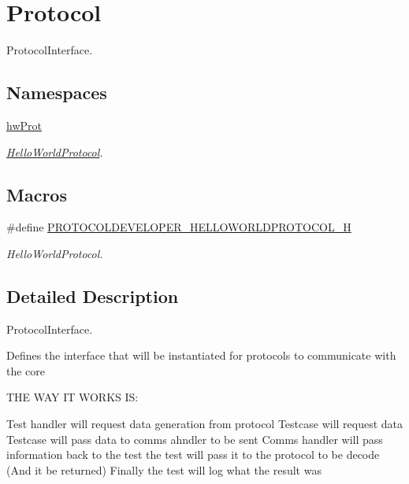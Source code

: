 \hypertarget{group__Protocol}{}\section{Protocol}
\label{group__Protocol}


Protocol\+Interface.  


\subsection*{Namespaces}
\begin{DoxyCompactItemize}
\item 
 \mbox{\hyperlink{namespacehwProt}{hw\+Prot}}
\begin{DoxyCompactList}\small\item\em \mbox{\hyperlink{classhwProt_1_1HelloWorldProtocol}{Hello\+World\+Protocol}}. \end{DoxyCompactList}\end{DoxyCompactItemize}
\subsection*{Macros}
\begin{DoxyCompactItemize}
\item 
\#define \mbox{\hyperlink{group__Protocol_ga2ed8336db1a0003c9333b1a4a38e21f2}{P\+R\+O\+T\+O\+C\+O\+L\+D\+E\+V\+E\+L\+O\+P\+E\+R\+\_\+\+H\+E\+L\+L\+O\+W\+O\+R\+L\+D\+P\+R\+O\+T\+O\+C\+O\+L\+\_\+H}}
\begin{DoxyCompactList}\small\item\em Hello\+World\+Protocol. \end{DoxyCompactList}\end{DoxyCompactItemize}


\subsection{Detailed Description}
Protocol\+Interface. 

Defines the interface that will be instantiated for protocols to communicate with the core

T\+HE W\+AY IT W\+O\+R\+KS IS\+:

Test handler will request data generation from protocol Testcase will request data Testcase will pass data to comms ahndler to be sent Comms handler will pass information back to the test the test will pass it to the protocol to be decode (And it be returned) Finally the test will log what the result was

